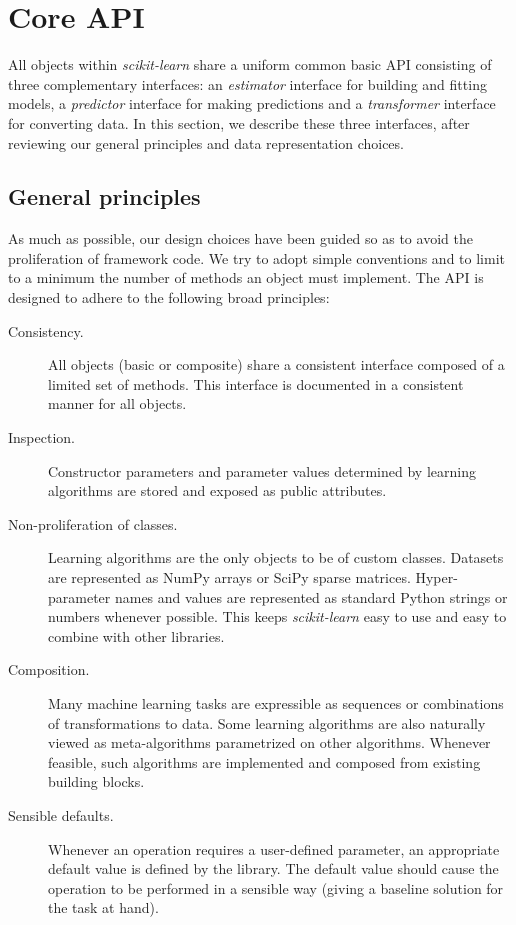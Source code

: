 \documentclass{llncs}
\newcommand{\sklearn}{\textit{scikit-learn}\xspace}
\begin{document}
\section{Core API}

\label{sec:core-api}

All objects within \sklearn share a uniform common basic API consisting of three
complementary interfaces: an \textit{estimator} interface for building and
fitting models, a \textit{predictor} interface for making predictions and a
\textit{transformer} interface for converting data. In this section, we describe
these three interfaces, after reviewing our general principles and data
representation choices.

\subsection{General principles}

As much as possible, our
design choices have been guided so as to avoid the proliferation of framework
code. We try to adopt simple conventions and to limit to a minimum the number of
methods an object must implement. The API is designed to adhere to the following
broad principles:

\begin{description}
  \item[Consistency.]
       All objects (basic or composite) share a consistent interface composed of
       a limited set of methods. This interface is documented in a consistent
       manner for all objects.
  \item[Inspection.]
       Constructor parameters and parameter values determined by learning
       algorithms are stored and exposed as public attributes.
  \item[Non-proliferation of classes.]
       Learning algorithms are the only objects to be of custom classes.
       Datasets are represented as NumPy arrays or SciPy sparse matrices.
       Hyper-parameter names and values are represented as standard
       Python strings or numbers whenever possible.
       This keeps \sklearn easy to use and easy to combine with other libraries.
  \item[Composition.]
       Many machine learning tasks are expressible
       as sequences or combinations of transformations to data.
       Some learning algorithms are also naturally viewed
       as meta-algorithms parametrized on other algorithms.
       Whenever feasible, such algorithms are implemented and composed from
       existing building blocks.
  \item[Sensible defaults.]
       Whenever an operation requires a user-defined parameter,
       an appropriate default value is defined by the library.
       The default value should cause the operation to be performed
       in a sensible way (giving a baseline solution for the task at hand).
\end{description}
\end{document}

